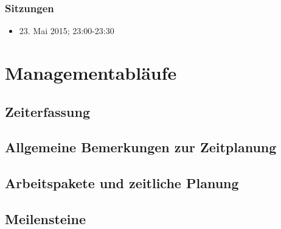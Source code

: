 \subsubsection*{Sitzungen}

\begin{itemize}
  \item 23. Mai 2015; 23:00-23:30
\end{itemize}

\section{Managementabläufe}

\subsection{Zeiterfassung}

\subsection{Allgemeine Bemerkungen zur Zeitplanung}

\subsection{Arbeitspakete und zeitliche Planung}

%
% 
%

\subsection{Meilensteine}


